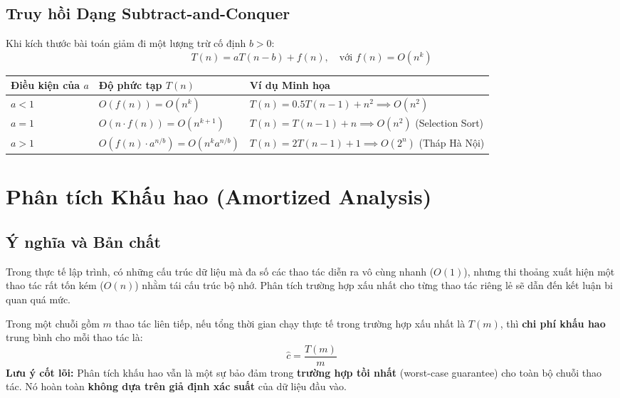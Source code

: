 \documentclass[11pt,a4paper]{article}
\begin{document}
\subsection{Truy hồi Dạng Subtract-and-Conquer}
Khi kích thước bài toán giảm đi một lượng trừ cố định $b > 0$:
\[
T(n) = a T(n - b) + f(n), \quad \text{với } f(n) = O(n^k)
\]
\begin{center}
\begin{tabularx}{\textwidth}{l X l}
\toprule
\textbf{Điều kiện của $a$} & \textbf{Độ phức tạp $T(n)$} & \textbf{Ví dụ Minh họa} \\
\midrule
$a < 1$ & $O(f(n)) = O(n^k)$ & $T(n) = 0.5 T(n-1) + n^2 \implies O(n^2)$ \\
$a = 1$ & $O(n \cdot f(n)) = O(n^{k+1})$ & $T(n) = T(n-1) + n \implies O(n^2)$ (Selection Sort) \\
$a > 1$ & $O(f(n) \cdot a^{n/b}) = O(n^k a^{n/b})$ & $T(n) = 2 T(n-1) + 1 \implies O(2^n)$ (Tháp Hà Nội) \\
\bottomrule
\end{tabularx}
\end{center}

\newpage
\section{Phân tích Khấu hao (Amortized Analysis)}

\subsection{Ý nghĩa và Bản chất}
Trong thực tế lập trình, có những cấu trúc dữ liệu mà đa số các thao tác diễn ra vô cùng nhanh ($O(1)$), nhưng thi thoảng xuất hiện một thao tác rất tốn kém ($O(n)$) nhằm tái cấu trúc bộ nhớ. Phân tích trường hợp xấu nhất cho từng thao tác riêng lẻ sẽ dẫn đến kết luận bi quan quá mức.

\begin{definitionbox}
Trong một chuỗi gồm $m$ thao tác liên tiếp, nếu tổng thời gian chạy thực tế trong trường hợp xấu nhất là $T(m)$, thì \textbf{chi phí khấu hao} trung bình cho mỗi thao tác là:
\[
\hat{c} = \frac{T(m)}{m}
\]
\textbf{Lưu ý cốt lõi:} Phân tích khấu hao vẫn là một sự bảo đảm trong \textbf{trường hợp tồi nhất} (worst-case guarantee) cho toàn bộ chuỗi thao tác. Nó hoàn toàn \textbf{không dựa trên giả định xác suất} của dữ liệu đầu vào.
\end{definitionbox}
\end{document}
